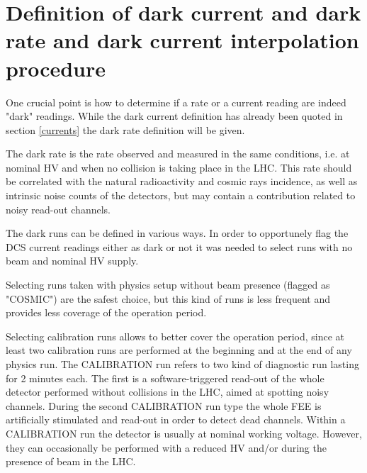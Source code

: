 \section{Definition of dark current and dark rate and dark current interpolation procedure}
One crucial point is how to determine if a rate or a current reading are indeed "dark" readings.
While the dark current definition has already been quoted in section \ref{currents} the dark rate definition will be given.

The dark rate is the rate observed and measured in the same conditions, i.e. at nominal HV and when no collision is taking place in the LHC.
This rate should be correlated with the natural radioactivity and cosmic rays incidence, as well as intrinsic noise counts of the detectors, but may contain a contribution related to noisy read-out channels.

The dark runs can be defined in various ways.
In order to opportunely flag the DCS current readings either as dark or not it was needed to select runs with no beam and nominal HV supply.

Selecting runs taken with physics setup without beam presence (flagged as "COSMIC") are the safest choice, but this kind of runs is less frequent and provides less coverage of the operation period.

Selecting calibration runs allows to better cover the operation period, since at least two calibration runs are performed at the beginning and at the end of any physics run.
The CALIBRATION run refers to two kind of diagnostic run lasting for 2 minutes each.
The first is a software-triggered read-out of the whole detector performed without collisions in the LHC, aimed at spotting noisy channels.
During the second CALIBRATION run type the whole FEE is artificially stimulated and read-out in order to detect dead channels.
Within a CALIBRATION run the detector is usually at nominal working voltage.
However, they can occasionally be performed with a reduced HV and/or during the presence of beam in the LHC.

